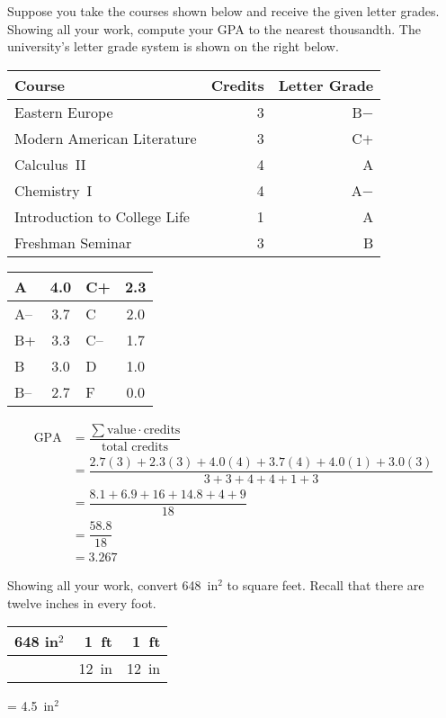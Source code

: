 \documentclass[12pt,letterpaper]{exam}
\begin{document}
\begin{questions}
\newpage
\question[10] Suppose you take the courses shown below and receive the given letter grades. Showing all your work, compute your GPA to the nearest thousandth. The university's letter grade system is shown on the right below. \par
	\begin{table}[!ht]
	\centering
	\begin{tabular}{lrr}
	Course & Credits & Letter Grade \\ \hline
	Eastern Europe & 3 & B$-$ \\
	Modern American Literature & 3 & C$+$ \\
	Calculus~II & 4 & A\phantom{$-$} \\
	Chemistry~I & 4 & A$-$ \\
	Introduction to College Life & 1 & A\phantom{$-$} \\
	Freshman Seminar & 3 & B\phantom{$-$}
	\end{tabular} \hspace{1cm}
        \begin{tabular}{|l||c|l||c|} \hline
        A & 4.0 & C+ & 2.3 \\ \hline
        A-- & 3.7 & C & 2.0 \\ \hline
        B+ & 3.3 & C-- & 1.7 \\ \hline
        B & 3.0 & D & 1.0 \\ \hline
        B-- & 2.7 & F & 0.0 \\ \hline
        \end{tabular}
	\end{table} \pspace

	\[
	\begin{aligned}
	\text{GPA}&= \dfrac{\sum \text{value} \cdot \text{credits}}{\text{total credits}} \\[0.3cm]
	&= \dfrac{2.7(3) + 2.3(3) + 4.0(4) + 3.7(4) + 4.0(1) + 3.0(3)}{3 + 3 + 4 + 4 + 1 + 3} \\[0.3cm]
	&= \dfrac{8.1 + 6.9 + 16 + 14.8 + 4 + 9}{18} \\[0.3cm]
	&= \dfrac{58.8}{18} \\[0.3cm]
	&= 3.267
	\end{aligned}
	\]



\newpage
\question[10] Showing all your work, convert 648~in$^2$ to square feet. Recall that there are twelve inches in every foot. \pspace

	\begin{table}[!ht]
	\centering
	\begin{tabular}{r|r|r}
	648 in$^2$ & 1~ft & 1~ft \\ \hline
			& 12~in & 12~in
	\end{tabular}
	= 4.5~in$^2$
	\end{table}




\end{questions}
\end{document}
